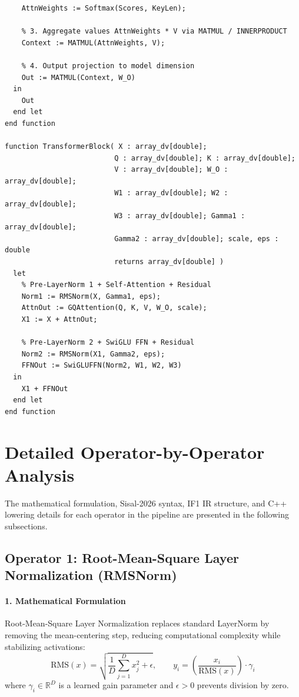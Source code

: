 \begin{lstlisting}[language=Sisal, caption={Sisal-2026 Transformer Block Implementation (\texttt{transformer\_gqa\_swiglu.sis}).}, label={lst:transformer_full}]
    % 2. Softmax normalization across key sequence axis
    AttnWeights := Softmax(Scores, KeyLen);
    
    % 3. Aggregate values AttnWeights * V via MATMUL / INNERPRODUCT
    Context := MATMUL(AttnWeights, V);
    
    % 4. Output projection to model dimension
    Out := MATMUL(Context, W_O)
  in
    Out
  end let
end function

function TransformerBlock( X : array_dv[double]; 
                          Q : array_dv[double]; K : array_dv[double]; 
                          V : array_dv[double]; W_O : array_dv[double];
                          W1 : array_dv[double]; W2 : array_dv[double]; 
                          W3 : array_dv[double]; Gamma1 : array_dv[double]; 
                          Gamma2 : array_dv[double]; scale, eps : double 
                          returns array_dv[double] )
  let
    % Pre-LayerNorm 1 + Self-Attention + Residual
    Norm1 := RMSNorm(X, Gamma1, eps);
    AttnOut := GQAttention(Q, K, V, W_O, scale);
    X1 := X + AttnOut;
    
    % Pre-LayerNorm 2 + SwiGLU FFN + Residual
    Norm2 := RMSNorm(X1, Gamma2, eps);
    FFNOut := SwiGLUFFN(Norm2, W1, W2, W3)
  in
    X1 + FFNOut
  end let
end function
\end{lstlisting}

\section{Detailed Operator-by-Operator Analysis}
\label{sec:operator_analysis}

The mathematical formulation, Sisal-2026 syntax, IF1 IR structure, and C++ lowering details for each operator in the pipeline are presented in the following subsections.

\subsection{Operator 1: Root-Mean-Square Layer Normalization (RMSNorm)}
\label{subsec:op_rmsnorm}

\paragraph{1. Mathematical Formulation}
Root-Mean-Square Layer Normalization replaces standard LayerNorm by removing the mean-centering step, reducing computational complexity while stabilizing activations:
\begin{equation}
\text{RMS}(x) = \sqrt{\frac{1}{D} \sum_{j=1}^D x_j^2 + \epsilon}, \qquad y_i = \left( \frac{x_i}{\text{RMS}(x)} \right) \cdot \gamma_i
\end{equation}
where $\gamma_i \in \mathbb{R}^D$ is a learned gain parameter and $\epsilon > 0$ prevents division by zero.

